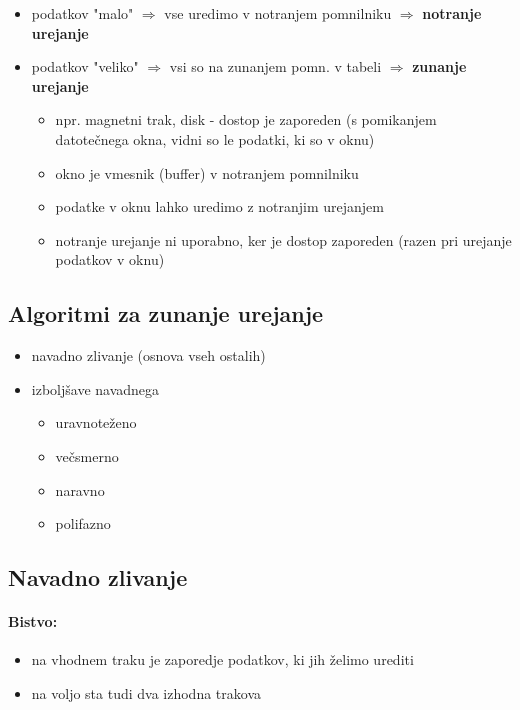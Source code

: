 \documentclass[a4paper,10pt]{article}
\begin{document}
\begin{itemize}
	\item podatkov "malo" $\Rightarrow$ vse uredimo v notranjem pomnilniku $\Rightarrow$ \textbf{notranje urejanje}
	\item podatkov "veliko" $\Rightarrow$ vsi so na zunanjem pomn. v tabeli $\Rightarrow$ \textbf{zunanje urejanje}
	\begin{itemize}
		\item npr. magnetni trak, disk - dostop je zaporeden (s pomikanjem datote\v cnega okna, vidni so le podatki, ki so v oknu)
		\item okno je vmesnik (buffer) v notranjem pomnilniku
		\item podatke v oknu lahko uredimo z notranjim urejanjem
		\item notranje urejanje ni uporabno, ker je dostop zaporeden (razen pri urejanje podatkov v oknu)
	\end{itemize}	
\end{itemize}

\subsection{Algoritmi za zunanje urejanje}

\begin{itemize}
\item navadno zlivanje (osnova vseh ostalih)
\item izbolj\v save navadnega
	\begin{itemize}
		\item uravnote\v zeno
		\item ve\v csmerno
		\item naravno
		\item polifazno
	\end{itemize}
\end{itemize}

\subsection{Navadno zlivanje}

\paragraph{Bistvo:}
\begin{itemize}
	\item na vhodnem traku je zaporedje podatkov, ki jih \v zelimo urediti
	\item na voljo sta tudi dva izhodna trakova
\end{itemize}
\end{document}
